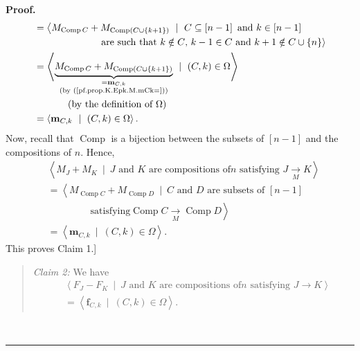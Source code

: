 \documentclass[numbers=enddot,12pt,final,onecolumn,notitlepage]{scrartcl}%
\theoremstyle{definition}
\newenvironment{statement}{\begin{quote}}{\end{quote}}
\newenvironment{proof}[1][Proof]{\noindent\textbf{#1.} }{\ \rule{0.5em}{0.5em}}
\begin{document}
\begin{proof}
\begin{align*}
&  =\left\langle M_{\operatorname*{Comp}C}+M_{\operatorname*{Comp}\left(
C\cup\left\{  k+1\right\}  \right)  }\ \mid\ C\subseteq\left[  n-1\right]
\text{ and }k\in\left[  n-1\right]  \right. \\
&  \ \ \ \ \ \ \ \ \ \ \ \ \ \ \ \ \ \ \ \ \left.  \text{are such that
}k\notin C\text{, }k-1\in C\text{ and }k+1\notin C\cup\left\{  n\right\}
\right\rangle \\
&  =\left\langle \underbrace{M_{\operatorname*{Comp}C}+M_{\operatorname*{Comp}%
\left(  C\cup\left\{  k+1\right\}  \right)  }}_{\substack{=\mathbf{m}%
_{C,k}\\\text{(by (\ref{pf.prop.K.Epk.M.mCk=}))}}}\ \mid\ \left(  C,k\right)
\in\Omega\right\rangle \\
&  \ \ \ \ \ \ \ \ \ \ \left(  \text{by the definition of }\Omega\right) \\
&  =\left\langle \mathbf{m}_{C,k}\ \mid\ \left(  C,k\right)  \in
\Omega\right\rangle .
\end{align*}
Now, recall that $\operatorname*{Comp}$ is a bijection between the subsets of
$\left[  n-1\right]  $ and the compositions of $n$. Hence,%
\begin{align*}
&  \left\langle M_{J}+M_{K}\ \mid\ J\text{ and }K\text{ are compositions of
}n\text{ satisfying }J\underset{M}{\rightarrow}K\right\rangle \\
&  =\left\langle M_{\operatorname*{Comp}C}+M_{\operatorname*{Comp}D}%
\ \mid\ C\text{ and }D\text{ are subsets of }\left[  n-1\right]  \right. \\
&  \ \ \ \ \ \ \ \ \ \ \ \ \ \ \ \ \ \ \ \ \left.  \text{satisfying
}\operatorname*{Comp}C\underset{M}{\rightarrow}\operatorname*{Comp}%
D\right\rangle \\
&  =\left\langle \mathbf{m}_{C,k}\ \mid\ \left(  C,k\right)  \in
\Omega\right\rangle .
\end{align*}
This proves Claim 1.]

\begin{statement}
\textit{Claim 2:} We have%
\begin{align*}
&  \left\langle F_{J}-F_{K}\ \mid\ J\text{ and }K\text{ are compositions of
}n\text{ satisfying }J\rightarrow K\right\rangle \\
&  =\left\langle \mathbf{f}_{C,k}\ \mid\ \left(  C,k\right)  \in
\Omega\right\rangle .
\end{align*}

\end{statement}


\end{proof}
\end{document}
